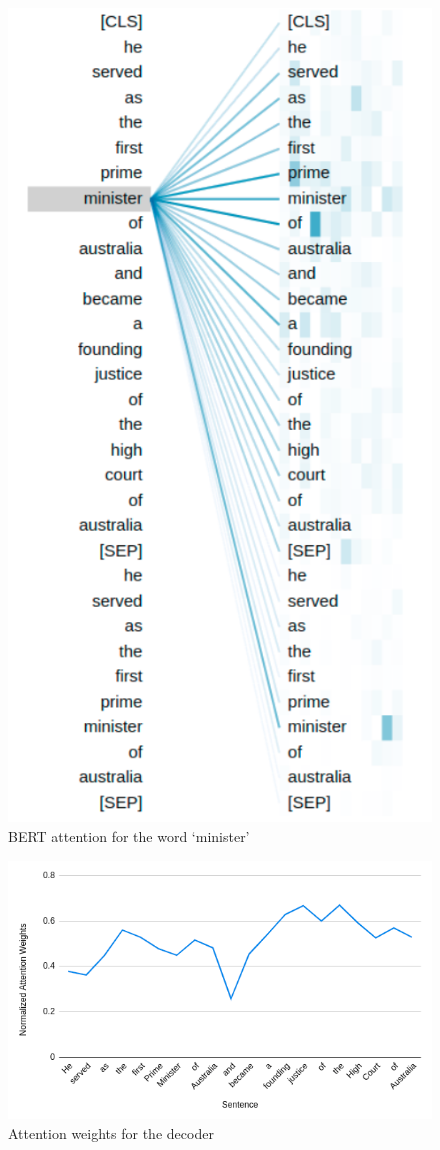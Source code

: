     \begin{figure}
    \begin{center}
    \advance\leftskip-3cm
    \advance\rightskip-3cm
    \includegraphics[keepaspectratio=true,width=0.5\hsize]{images/imojie/minister_cut.png}
    \caption{BERT attention for the word `minister'}
    \label{fig:minister}
    \end{center}
    \end{figure}
    
    \begin{figure}
    \begin{center}
    \advance\leftskip-3cm
    \advance\rightskip-3cm
    \includegraphics[keepaspectratio=true,width=\hsize]{images/imojie/att_weights.png}
    \caption{Attention weights for the decoder}
    \label{fig:att_weights}
    \end{center}
    \end{figure}